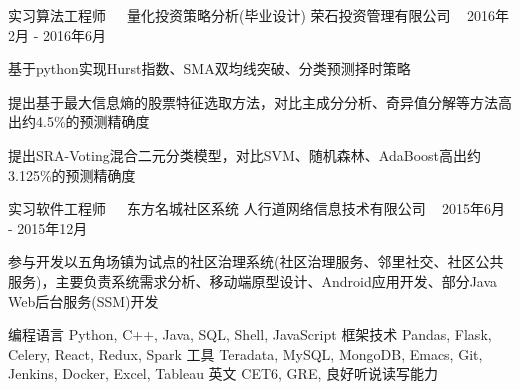 \documentclass[11pt, a4paper, UTF8]{awesome-cv}
\begin{document}
\begin{cventries}
  \cventry
    {实习算法工程师{\ \cdotp\ \ }量化投资策略分析(毕业设计)} %
    {荣石投资管理有限公司} %
    {\ } %
    {2016年2月 - 2016年6月} %
    {
      \begin{cvitems} %
        \item {基于python实现Hurst指数、SMA双均线突破、分类预测择时策略}
        \item {提出基于最大信息熵的股票特征选取方法，对比主成分分析、奇异值分解等方法高出约4.5\%的预测精确度}
        \item {提出SRA-Voting混合二元分类模型，对比SVM、随机森林、AdaBoost高出约3.125\%的预测精确度}
      \end{cvitems}
    }
    
  \cventry
    {实习软件工程师{\ \cdotp\ \ }东方名城社区系统} %
    {人行道网络信息技术有限公司} %
    {\ } %
    {2015年6月 - 2015年12月} %
    {
      \begin{cvitems} %
        \item {参与开发以五角场镇为试点的社区治理系统(社区治理服务、邻里社交、社区公共服务)，主要负责系统需求分析、移动端原型设计、Android应用开发、部分Java Web后台服务(SSM)开发}
      \end{cvitems}
    }
    
\end{cventries}



%
\begin{cvskills}
  \cvskill
    {编程语言} %
    {Python, C++, Java, SQL, Shell, JavaScript} %
  \cvskill
    {框架技术} %
    {Pandas, Flask, Celery, React, Redux, Spark} %
  \cvskill
    {工具} %
    {Teradata, MySQL, MongoDB, Emacs, Git, Jenkins, Docker, Excel, Tableau} %
  \cvskill
    {英文} %
    {CET6, GRE, 良好听说读写能力} %
\end{cvskills}



%
%
%
%
%


\end{document}

